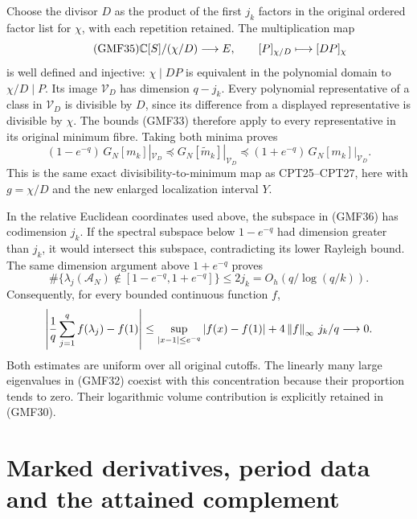 \documentclass[11pt,a4paper]{article}
\begin{document}
Choose the divisor \(D\) as the product of the first \(j_k\)
factors in the original ordered factor list for \(\chi\),
with each repetition retained.  The multiplication map
\begin{equation}\tag{GMF35}
 \mathbb C[S]/(\chi/D)\longrightarrow E,\qquad
 [P]_{\chi/D}\longmapsto[DP]_\chi
\end{equation}
is well defined and injective: \(\chi\mid DP\) is
equivalent in the polynomial domain to \(\chi/D\mid P\).
Its image \(\mathcal V_D\) has dimension \(q-j_k\).
Every polynomial representative of a class in \(\mathcal V_D\)
is divisible by \(D\), since its difference from a displayed
representative is divisible by \(\chi\).
The bounds (GMF33) therefore apply to every representative
in its original minimum fibre.  Taking both minima proves
\begin{equation}\tag{GMF36}
 (1-e^{-q})\,G_N[m_k]|_{\mathcal V_D}
 \preceq G_N[\widetilde m_k]|_{\mathcal V_D}
 \preceq(1+e^{-q})\,G_N[m_k]|_{\mathcal V_D}.
\end{equation}
This is the same exact divisibility-to-minimum map as
CPT25--CPT27, here with \(g=\chi/D\) and the new enlarged
localization interval \(Y\).

In the relative Euclidean coordinates used above, the
subspace in (GMF36) has codimension \(j_k\).
If the spectral subspace below \(1-e^{-q}\) had dimension
greater than \(j_k\), it would intersect this subspace,
contradicting its lower Rayleigh bound.
The same dimension argument above \(1+e^{-q}\) proves
\begin{equation}\tag{GMF37}
 \boxed{
 \#\{\lambda_j(\mathcal A_N)\notin
          [1-e^{-q},1+e^{-q}]\}
 \le2j_k=O_h(q/\log(q/k)).}
\end{equation}
Consequently, for every bounded continuous function \(f\),
\[
 \left|\frac1q\sum_{j=1}^q f(\lambda_j)-f(1)\right|
 \le\sup_{|x-1|\le e^{-q}}|f(x)-f(1)|
                    +4\left\lVert f\right\rVert_\infty\,j_k/q\longrightarrow0 .
\]
Both estimates are uniform over all original cutoffs.
The linearly many large eigenvalues in (GMF32) coexist
with this concentration because their proportion tends
to zero.  Their logarithmic volume contribution is
explicitly retained in (GMF30).

\section{Marked derivatives, period data and the attained complement}
\end{document}
